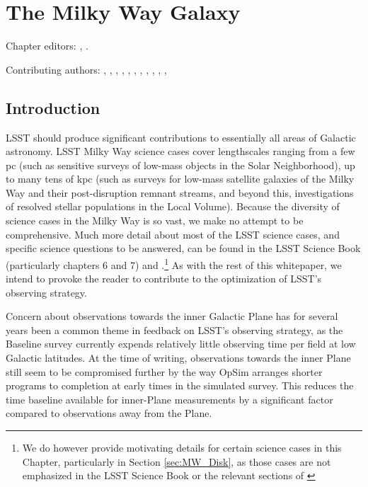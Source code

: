 
\chapter[The Milky Way Galaxy]{The Milky Way Galaxy}
\def\chpname{galaxy}\label{chp:\chpname}

Chapter editors:
,
.

Contributing authors:
,
,
,
,
,
,
,
,
,
,
,



\section{Introduction}
\def\secname{MW_Intro}\label{sec:\secname}

LSST should produce significant contributions to essentially all areas
of Galactic astronomy. LSST Milky Way science cases cover lengthscales
ranging from a few pc (such as sensitive surveys of low-mass objects in
the Solar Neighborhood), up to many tens of kpc (such as surveys for
low-mass satellite galaxies of the Milky Way and their post-disruption
remnant streams, and beyond this, investigations of resolved stellar
populations in the Local Volume). Because the diversity of science cases
in the Milky Way is so vast, we make no attempt to be comprehensive.
Much more detail about most of the LSST science cases, and specific
science questions to be answered, can be found in the LSST Science Book
(particularly chapters 6 and 7) and \citet[][in particular Sections
2.1.4 and 4.4]{IvezicEtal2008}.\footnote{We do however provide
motivating details for certain science cases in this Chapter,
particularly in Section \ref{sec:MW_Disk}, as those cases are not
emphasized in the LSST Science Book or the relevant sections of
\citet{IvezicEtal2008}} As with the rest of this whitepaper, we intend
to provoke the reader to contribute to the optimization of LSST's
observing strategy.

Concern about observations towards the inner Galactic Plane has for
several years been a common theme in feedback on LSST's observing
strategy, as the Baseline survey currently expends relatively little
observing time per field at low Galactic latitudes. At the time of
writing, observations towards the inner Plane still seem to be
compromised further by the way OpSim arranges shorter programs to
completion at early times in the simulated survey. This reduces the time
baseline available for inner-Plane measurements by a significant factor
compared to observations away from the Plane.

